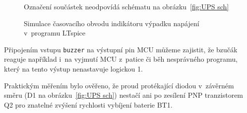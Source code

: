 \begin{figure}
    \centering
    \par\bigskip
    {\footnotesize Označení součástek neodpovídá schématu na
    obrázku~\vref{fig:UPS sch}}
    \caption{%
        Simulace časovacího obvodu indikátoru výpadku napájení v~programu
        LTspice
    }
    \label{fig:UPS RC sim}
\end{figure}

Připojením vstupu \texttt{buzzer} na výstupní pin MCU můžeme zajistit, že
bzučák reaguje například i~na vyjmutí MCU z~patice či běh nesprávného programu,
který na tento výstup nenastavuje logickou 1.

Praktickým měřením bylo ověřeno, že proud protékající diodou v~závěrném směru
(D1 na obrázku~\vref{fig:UPS sch}) nestačí ani po zesílení PNP tranzistorem Q2
pro znatelné zvýšení rychlosti vybíjení baterie BT1.
